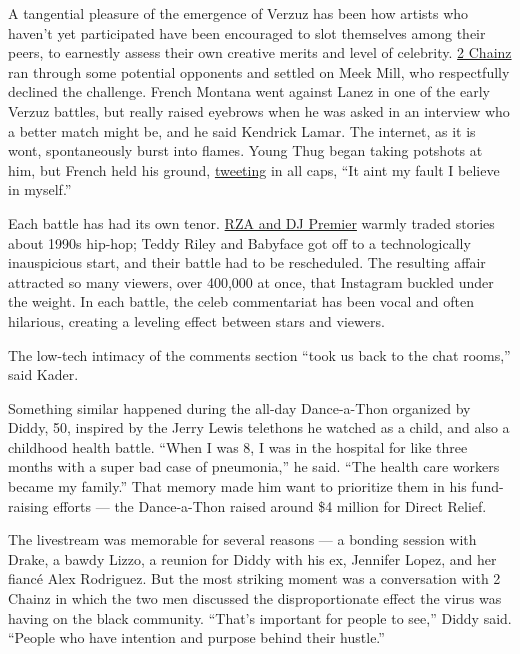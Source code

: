 A tangential pleasure of the emergence of Verzuz has been how artists
who haven't yet participated have been encouraged to slot themselves
among their peers, to earnestly assess their own creative merits and
level of celebrity.
\href{https://www.complex.com/music/2020/04/meek-mill-responds-2-chainz-hit-battle-challenge}{2
Chainz} ran through some potential opponents and settled on Meek Mill,
who respectfully declined the challenge. French Montana went against
Lanez in one of the early Verzuz battles, but really raised eyebrows
when he was asked in an interview who a better match might be, and he
said Kendrick Lamar. The internet, as it is wont, spontaneously burst
into flames. Young Thug began taking potshots at him, but French held
his ground,
\href{https://twitter.com/FrencHMonTanA/status/1252791704954028032}{tweeting}
in all caps, ``It aint my fault I believe in myself.''

Each battle has had its own tenor.
\href{https://www.youtube.com/watch?v=mcM3MKN92O0}{RZA and DJ Premier}
warmly traded stories about 1990s hip-hop; Teddy Riley and Babyface got
off to a technologically inauspicious start, and their battle had to be
rescheduled. The resulting affair attracted so many viewers, over
400,000 at once, that Instagram buckled under the weight. In each
battle, the celeb commentariat has been vocal and often hilarious,
creating a leveling effect between stars and viewers.

The low-tech intimacy of the comments section ``took us back to the chat
rooms,'' said Kader.

Something similar happened during the all-day Dance-a-Thon organized by
Diddy, 50, inspired by the Jerry Lewis telethons he watched as a child,
and also a childhood health battle. ``When I was 8, I was in the
hospital for like three months with a super bad case of pneumonia,'' he
said. ``The health care workers became my family.'' That memory made him
want to prioritize them in his fund-raising efforts --- the Dance-a-Thon
raised around \$4 million for Direct Relief.

The livestream was memorable for several reasons --- a bonding session
with Drake, a bawdy Lizzo, a reunion for Diddy with his ex, Jennifer
Lopez, and her fiancé Alex Rodriguez. But the most striking moment was a
conversation with 2 Chainz in which the two men discussed the
disproportionate effect the virus was having on the black community.
``That's important for people to see,'' Diddy said. ``People who have
intention and purpose behind their hustle.''

